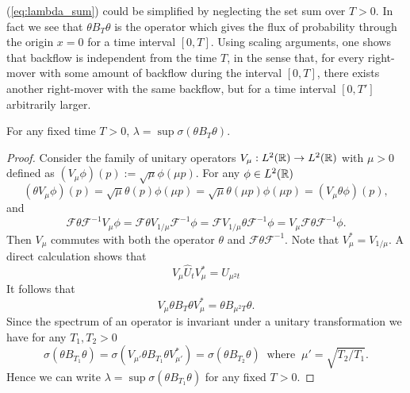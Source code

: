 \begin{oss}
	(\ref{eq:lambda_sum}) could be simplified by neglecting the set sum over $T>0$. In fact we see that $\theta B_T\theta$ is the operator which gives the flux of probability through the origin $x=0$ for a time interval $[0,T]$. Using scaling arguments, one shows that backflow is independent from the time $T$, in the sense that, for every right-mover with some amount of backflow during the interval $[0,T]$, there exists another right-mover with the same backflow, but for a time interval $[0,T']$ arbitrarily larger.
\end{oss}

\begin{prop}
	For any fixed time $T>0$, $\lambda=\sup \sigma(\theta B_T\theta)$.
	\label{prop:time_independence}
\end{prop}
\begin{proof}
	Consider the family of unitary operators $V_\mu:L^2({\mathbb R})\to L^2({\mathbb R}) $ with $\mu>0$ defined as $(V_\mu\phi)(p):=\sqrt{\mu}\phi(\mu p)$. For any $\phi\in L^2({\mathbb R})$
	\begin{equation}
		(\theta V_\mu \phi)(p)=\sqrt{\mu}\theta(p)\phi(\mu p)=\sqrt{\mu}\theta(\mu p)\phi(\mu p)=(V_\mu\theta\phi)(p),
	\end{equation}
	and
	\begin{equation}
		\mathcal{F}\theta\mathcal{F}^{-1}V_\mu\phi=\mathcal{F}\theta V_{1/\mu}\mathcal{F}^{-1}\phi=\mathcal{F} V_{1/\mu}\theta\mathcal{F}^{-1}\phi=V_\mu	\mathcal{F}\theta\mathcal{F}^{-1}\phi.
	\end{equation}
	Then $V_\mu$ commutes with both the operator $\theta$ and $	\mathcal{F}\theta\mathcal{F}^{-1}$. Note that $V_\mu^*=V_{1/\mu}$. A direct calculation shows that
	\begin{equation}
		V_\mu \widehat{U}_t V_\mu^*= \widehat{U}_{\mu^2t}
	\end{equation}
	It follows that
	\begin{equation}
		V_\mu\theta B_T \theta V_\mu^*=\theta B_{\mu^2T}\theta.
	\end{equation}
	Since the spectrum of an operator is invariant under a unitary transformation we have for any $T_1,T_2>0$
	\begin{equation}
	\sigma(\theta B_{T_1}\theta)=\sigma(V_{\mu'}\theta B_{T_1} \theta V_{\mu'}^*)=\sigma(\theta B_{T_2}\theta)\ \text{ where } \ \mu'=\sqrt{T_2 / T_1}.
	\end{equation}
    Hence we can write $\lambda=\sup\sigma(\theta B_{T_1}\theta)$ for any fixed $T>0.$
\end{proof}

